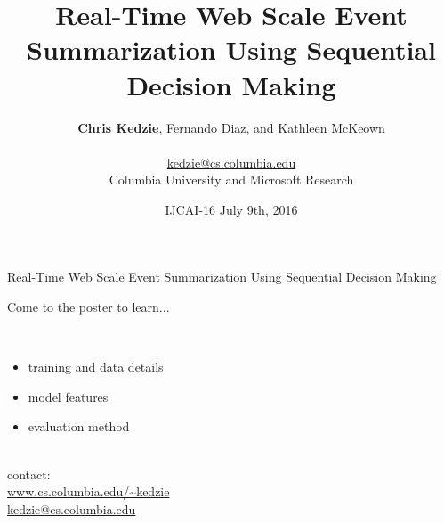 \documentclass{beamer}
\title{Real-Time Web Scale Event Summarization Using Sequential Decision 
    Making}
\author{\textbf{Chris Kedzie}, Fernando Diaz, and Kathleen McKeown\\
    ~\\
    \url{kedzie@cs.columbia.edu}\\
    Columbia University and Microsoft Research}
\date{IJCAI-16 July 9th, 2016}
\begin{document}
\maketitle






\begin{frame}{Real-Time Web Scale Event Summarization Using Sequential 
    Decision Making}

\Large Come to the poster to learn...

~\\

\begin{itemize}
        \Large
   \item training and data details
   \item model features
   \item evaluation method
\end{itemize}

~\\


contact:\\ \url{www.cs.columbia.edu/~kedzie}\\
\url{kedzie@cs.columbia.edu}

\end{frame}



\end{document}

